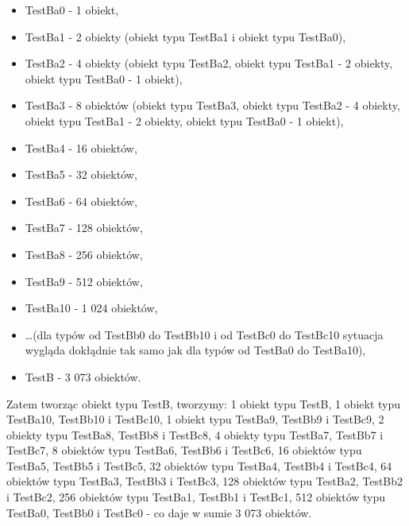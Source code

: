 \documentclass[12pt]{article}
\begin{document}
\begin{itemize}
	\item TestBa0 - 1 obiekt,
	\item TestBa1 - 2 obiekty (obiekt typu TestBa1 i obiekt typu TestBa0),
	\item TestBa2 - 4 obiekty (obiekt typu TestBa2, obiekt typu TestBa1 - 2 obiekty, obiekt typu TestBa0 - 1 obiekt),
	\item TestBa3 - 8 obiektów (obiekt typu TestBa3, obiekt typu TestBa2 - 4 obiekty, obiekt typu TestBa1 - 2 obiekty, obiekt typu TestBa0 - 1 obiekt),
	\item TestBa4 - 16 obiektów,
	\item TestBa5 - 32 obiektów,
	\item TestBa6 - 64 obiektów,
	\item TestBa7 - 128 obiektów,
	\item TestBa8 - 256 obiektów,
	\item TestBa9 - 512 obiektów,
	\item TestBa10 - 1 024 obiektów,
	\item \ldots (dla typów od TestBb0 do TestBb10 i od TestBc0 do TestBc10 sytuacja wygląda dokłądnie tak samo jak dla typów od TestBa0 do TestBa10),
	\item TestB - 3 073 obiektów.
\end{itemize}
Zatem tworząc obiekt typu TestB, tworzymy: 1 obiekt typu TestB, 1 obiekt typu TestBa10, TestBb10 i TestBc10, 1 obiekt typu TestBa9, TestBb9 i TestBc9, 2 obiekty typu TestBa8, TestBb8 i TestBc8, 4 obiekty typu TestBa7, TestBb7 i TestBc7, 8 obiektów typu TestBa6, TestBb6 i TestBc6, 16 obiektów typu TestBa5, TestBb5 i TestBc5, 32 obiektów typu TestBa4, TestBb4 i TestBc4, 64 obiektów typu TestBa3, TestBb3 i TestBc3, 128 obiektów typu TestBa2, TestBb2 i TestBc2, 256 obiektów typu TestBa1, TestBb1 i TestBc1, 512 obiektów typu TestBa0, TestBb0 i TestBc0 - co daje w sumie 3 073 obiektów.
\end{document}

